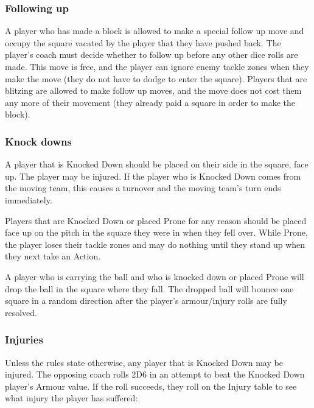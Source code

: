 \documentclass{article}
\begin{document}
\begin{multicols}{2}
\subsubsection{Following up}
\par A player who has made a block is allowed to make a special follow up move and occupy the square vacated by the player that they have pushed back. The player's coach must decide whether to follow up before any other dice rolls are made. This move is free, and the player can ignore enemy tackle zones when they make the move (they do not have to dodge to enter the square). Players that are blitzing are allowed to make follow up moves, and the move does not cost them any more of their movement (they already paid a square in order to make the block).

\subsubsection{Knock downs}
\par A player that is Knocked Down should be placed on their side in the square, face up. The player may be injured. If the player who is Knocked Down comes from the moving team, this causes a turnover and the moving team's turn ends immediately.
\par Players that are Knocked Down or placed Prone for any reason should be placed face up on the pitch in the square they were in when they fell over. While Prone, the player loses their tackle zones and may do nothing until they stand up when they next take an Action.
\par A player who is carrying the ball and who is knocked down or placed Prone will drop the ball in the square where they fall. The dropped ball will bounce one square in a random direction after the player's armour/injury rolls are fully resolved.

\subsubsection{Injuries}
\par Unless the rules state otherwise, any player that is Knocked Down may be injured. The opposing coach rolls 2D6 in an attempt to beat the Knocked Down player's Armour value. If the roll succeeds, they roll on the Injury table to see what injury the player has suffered:


\end{multicols}
\end{document}
